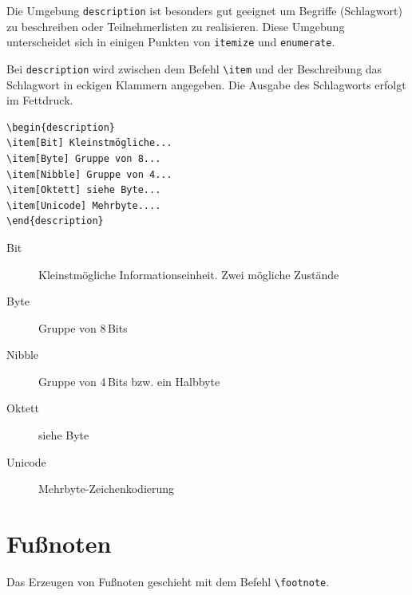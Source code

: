 \documentclass[a4paper,10pt,twoside]{scrbook}
\begin{document}
Die Umgebung \verb!description! ist besonders gut geeignet um Begriffe (Schlagwort) zu beschreiben oder Teilnehmerlisten zu realisieren. Diese Umgebung unterscheidet sich in einigen Punkten von \verb!itemize! und \verb!enumerate!.


Bei \verb!description! wird zwischen dem Befehl \verb!\item! und der Beschreibung das Schlagwort in eckigen Klammern angegeben. Die Ausgabe des Schlagworts erfolgt im Fettdruck. 

\begin{minipage}[h]{0.44\textwidth}
\setlength{\parskip}{1em}
\frenchspacing
\begin{Verbatim}[frame=single]
\begin{description}
\item[Bit] Kleinstmögliche...
\item[Byte] Gruppe von 8...
\item[Nibble] Gruppe von 4...
\item[Oktett] siehe Byte...
\item[Unicode] Mehrbyte....
\end{description}
\end{Verbatim}
\end{minipage}
\hfill
\begin{minipage}[h]{0.54\textwidth}
\setlength{\parskip}{1em}
\frenchspacing
\begin{description}
\item[Bit] Kleinstmögliche Informationseinheit. Zwei mögliche Zustände
\item[Byte] Gruppe von 8\,Bits
\item[Nibble] Gruppe von 4\,Bits bzw. ein Halbbyte
\item[Oktett] siehe Byte
\item[Unicode] Mehrbyte-Zeichenkodierung
\end{description}
\end{minipage}

\section{Fußnoten}

Das Erzeugen von Fußnoten geschieht mit dem Befehl \verb!\footnote!. 


\end{document}
